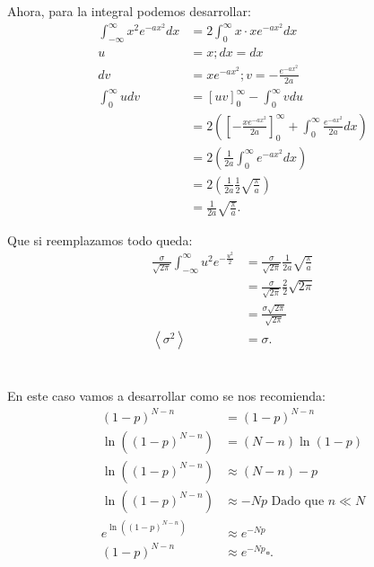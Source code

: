 \documentclass{report}
\begin{document}
Ahora, para la integral podemos desarrollar:
\begin{align*}
  \int_{-\infty}^{\infty} x^2 e^{- a x^2} dx &= 2\int_{0}^{\infty} x \cdot x e^{-a x^{2}} dx \\
  u &= x; dx = dx \\
  dv &= x e^{-a x^2}; v = -\frac{e^{-ax^2}}{2a} \\
  \int_{0}^{\infty} udv &= \left[ uv \right]_{0}^{\infty}  - \int_0^{\infty} vdu\\
  &=2 \left( \left[ - \frac{x e^{-ax^2}}{2a} \right]_{0}^{\infty} + \int_{0}^{\infty} \frac{e^{-ax^2}}{2a} dx \right) \\
  &= 2\left( \frac{1}{2a} \int_{0}^{\infty} e^{-ax^2} dx\right)  \\
  &= 2\left( \frac{1}{2a} \frac{1}{2}\sqrt{\frac{\pi}{a}}  \right)  \\
  &= \frac{1}{2a} \sqrt{\frac{\pi}{a}}
.\end{align*}

Que si reemplazamos todo queda:
\begin{align*}
  \frac{\sigma}{\sqrt{2\pi}} \int_{-\infty}^{\infty} u^2 e^{- \frac{u^2}{2}} &= \frac{\sigma}{\sqrt{2\pi} } \frac{1}{2a} \sqrt{\frac{\pi}{a}}  \\
  &= \frac{\sigma}{\sqrt{2\pi} } \frac{2}{2} \sqrt{2\pi}  \\
  &= \frac{\sigma \sqrt{2\pi} }{\sqrt{2\pi} } \\
  \left<\sigma^2 \right> &= \sigma
.\end{align*}

\chapter{}

\section{}

En este caso vamos a desarrollar como se nos recomienda:
\begin{align*}
  \left( 1 - p \right)^{N -n} &= \left( 1 - p \right)^{N - n} \\
  \ln\left( \left( 1 - p \right)^{N - n} \right)  &= \left( N - n \right) \ln\left( 1 - p \right)  \\
  \ln\left( \left( 1 - p \right)^{N - n} \right) &\approx \left( N - n \right) -p \\
  \ln\left( \left( 1 - p \right)^{N - n} \right) &\approx -Np \text{ Dado que } n \ll N\\
  e^{\ln\left( \left( 1 - p \right)^{N - n} \right) } &\approx e^{-Np}\\
  \left( 1 - p \right)^{N - n} &\approx e^{-Np} \square
.\end{align*}
\end{document}
